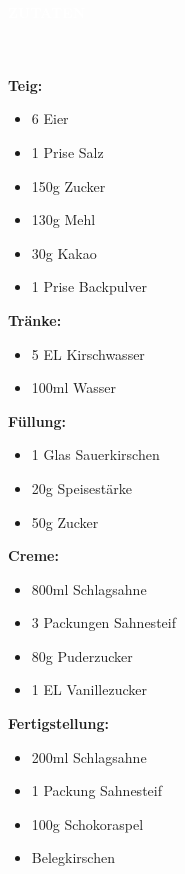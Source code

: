 \documentclass[a4paper, 12 pt]{article}
\newcommand{\coloredSection}[1]{{\small \colorbox{DeepSkyBlue1}{\begin{minipage}{0.99\textwidth}{\textbf{#1 \vphantom{p\^{E}}}}\end{minipage}}}}
\begin{document}
\noindent
\coloredSection{\textbf{\textcolor{white}{ZUTATEN}}}\\[-0.3cm]
\\
\textbf{Teig:} 
\begin{itemize}
    \item 6 Eier
    \item 1 Prise Salz
    \item 150g Zucker
    \item 130g Mehl
    \item 30g Kakao
    \item 1 Prise Backpulver
\end{itemize} 
\textbf{Tränke:}
\begin{itemize}
    \item 5 EL Kirschwasser
    \item 100ml Wasser
\end{itemize} 
\textbf{Füllung:}
\begin{itemize}
    \item 1 Glas Sauerkirschen
    \item 20g Speisestärke
    \item 50g Zucker
\end{itemize} 
\textbf{Creme:}
\begin{itemize}
    \item 800ml Schlagsahne
    \item 3 Packungen Sahnesteif
    \item 80g Puderzucker
    \item 1 EL Vanillezucker
\end{itemize} 
\textbf{Fertigstellung:}
\begin{itemize}
    \item 200ml Schlagsahne
    \item 1 Packung Sahnesteif
    \item 100g Schokoraspel
    \item Belegkirschen
\end{itemize} \\
\end{document}
